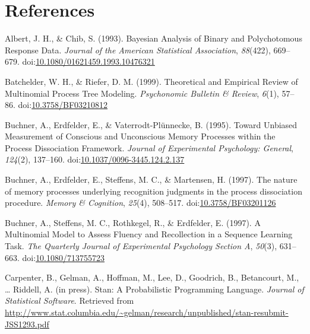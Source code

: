 \documentclass[floatsintext,man]{apa6}
\begin{document}
\clearpage

\section{References}\label{references}

\setlength{\parindent}{-0.5in} \setlength{\leftskip}{0.5in}
\setlength{\parskip}{8pt}

\hypertarget{refs}{}
\hypertarget{ref-albertux5fbayesianux5f1993}{}
Albert, J. H., \& Chib, S. (1993). Bayesian Analysis of Binary and
Polychotomous Response Data. \emph{Journal of the American Statistical
Association}, \emph{88}(422), 669--679.
doi:\href{https://doi.org/10.1080/01621459.1993.10476321}{10.1080/01621459.1993.10476321}

\hypertarget{ref-batchelderux5ftheoreticalux5f1999}{}
Batchelder, W. H., \& Riefer, D. M. (1999). Theoretical and Empirical
Review of Multinomial Process Tree Modeling. \emph{Psychonomic Bulletin
\& Review}, \emph{6}(1), 57--86.
doi:\href{https://doi.org/10.3758/BF03210812}{10.3758/BF03210812}

\hypertarget{ref-buchnerux5ftowardux5f1995}{}
Buchner, A., Erdfelder, E., \& Vaterrodt-Plünnecke, B. (1995). Toward
Unbiased Measurement of Conscious and Unconscious Memory Processes
within the Process Dissociation Framework. \emph{Journal of Experimental
Psychology: General}, \emph{124}(2), 137--160.
doi:\href{https://doi.org/10.1037/0096-3445.124.2.137}{10.1037/0096-3445.124.2.137}

\hypertarget{ref-buchnerux5fnatureux5f1997}{}
Buchner, A., Erdfelder, E., Steffens, M. C., \& Martensen, H. (1997).
The nature of memory processes underlying recognition judgments in the
process dissociation procedure. \emph{Memory \& Cognition},
\emph{25}(4), 508--517.
doi:\href{https://doi.org/10.3758/BF03201126}{10.3758/BF03201126}

\hypertarget{ref-buchnerux5fmultinomialux5f1997}{}
Buchner, A., Steffens, M. C., Rothkegel, R., \& Erdfelder, E. (1997). A
Multinomial Model to Assess Fluency and Recollection in a Sequence
Learning Task. \emph{The Quarterly Journal of Experimental Psychology
Section A}, \emph{50}(3), 631--663.
doi:\href{https://doi.org/10.1080/713755723}{10.1080/713755723}

\hypertarget{ref-carpenterux5fstanux5finpress}{}
Carpenter, B., Gelman, A., Hoffman, M., Lee, D., Goodrich, B.,
Betancourt, M., \ldots{} Riddell, A. (in press). Stan: A Probabilistic
Programming Language. \emph{Journal of Statistical Software}. Retrieved
from
\url{http://www.stat.columbia.edu/~gelman/research/unpublished/stan-resubmit-JSS1293.pdf}
\end{document}
